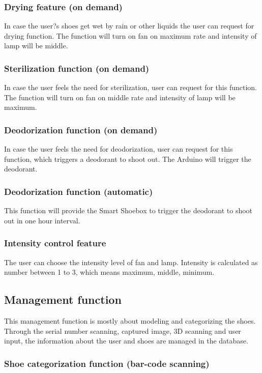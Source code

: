 \documentclass[conference]{IEEEtran}
\begin{document}
\subsubsection{Drying feature (on demand)}
In case the user?s shoes get wet by rain or other liquids the user can request for drying function. The function will turn on fan on maximum rate and intensity of lamp will be middle.

\subsubsection{Sterilization function (on demand)}
In case the user feels the need for sterilization, user can request for this function. The function will turn on fan on middle rate and intensity of lamp will be maximum.

\subsubsection{Deodorization function (on demand)}
In case the user feels the need for deodorization, user can request for this function, which triggers a deodorant to shoot out. The Arduino will trigger the deodorant.

\subsubsection{Deodorization function (automatic)}
This function will provide the Smart Shoebox to trigger the deodorant to shoot out in one hour interval. 

\subsubsection{Intensity control feature}
The user can choose the intensity level of fan and lamp. Intensity is calculated as number between 1 to 3, which means maximum, middle, minimum.

\subsection{Management function}
This management function is mostly about modeling and categorizing the shoes. Through the serial number scanning, captured image, 3D scanning and user input, the information about the user and shoes are managed in the database. 
\subsubsection{Shoe categorization function (bar-code scanning)}
\end{document}
